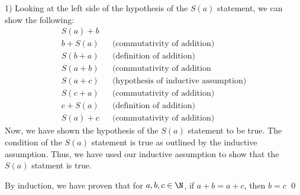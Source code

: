 \begin{paragraph}{1)}
        Looking at the left side of the hypothesis of the $S(a)$ statement, we can show the following:
        \begin{align*}
            S(a) + b\\
            b + S(a) && \text{(commutativity of addition)} \\
            S(b + a)&& \text{(definition of addition)} \\
            S(a + b) && \text{(commutativity of addition} \\
            S(a + c) && \text{(hypothesis of inductive assumption)} \\
            S(c + a) && \text{(commutativity of addition)} \\
            c + S(a) && \text{(definition of addition)} \\
            S(a) + c && \text{(commutativity of addition)}
        \end{align*}
        Now, we have shown the hypothesis of the $S(a)$ statement to be true. The condition of the $S(a)$ statement is true as outlined by 
        the inductive assumption. Thus, we have used our inductive assumption to show that the $S(a)$ statment is true.
        \spacing
        
        By induction, we have proven that for $a, b, c \in \N$, if $a + b = a + c$, then $b = c$ \qed
    \end{paragraph}
    
    \bigskip

